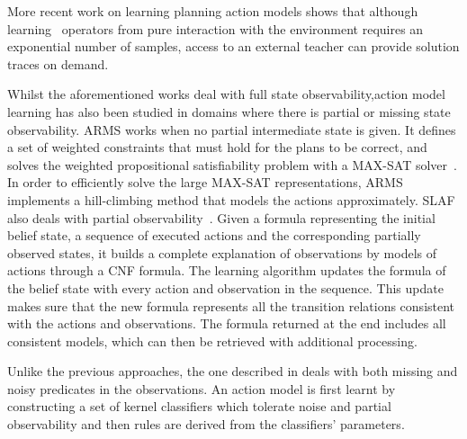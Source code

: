 More recent work on learning planning action models \cite{WalshL08} shows that although learning \strips\ operators from pure interaction with the environment requires an exponential number of samples, access to an external teacher can provide solution traces on demand.

Whilst the aforementioned works deal with full state observability,action model learning has also been studied in domains where there is partial or missing state observability. {\sf ARMS} works when no partial intermediate state is given. It defines a set of weighted constraints that must hold for the plans to be correct, and solves the weighted propositional satisfiability problem with a MAX-SAT solver~\cite{yang2007learning}. In order to efficiently solve the large MAX-SAT representations, {\sf ARMS} implements a hill-climbing method that models the actions approximately. %
{\sc SLAF} also deals with partial observability~\cite{amir:alearning:JAIR08}. Given a formula representing the initial belief state, a sequence of executed actions and the corresponding partially observed states, it builds a complete explanation of observations by models of actions through a CNF formula. The learning algorithm updates the formula of the belief state with every action and observation in the sequence. This update makes sure that the new formula represents all the transition relations consistent with the actions and observations. The formula returned at the end includes all consistent models, which can then be retrieved with additional processing.

Unlike the previous approaches, the one described in \cite{MouraoZPS12} deals with both missing and noisy predicates in the observations. An action model is first learnt by constructing a set of kernel classifiers which tolerate noise and partial observability and then \strips rules are derived from the classifiers' parameters.

